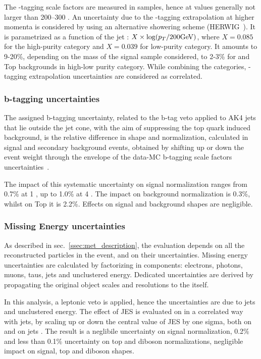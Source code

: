 \noindent The \V-tagging scale factors are measured in \ttbar samples, hence at \pt values generally not larger than 200--300 \GeV. An uncertainty due to the \V-tagging extrapolation at higher momenta is considered by using an alternative showering scheme (HERWIG~\cite{bib:HERWIG}). It is parametrized as a function of the jet \pt: $X \times \log(p_T/200 \text{GeV})$, where $X=0.085$ for the high-purity category and $X=0.039$ for low-purity category. It amounts to 9-20\%, depending on the mass of the signal sample considered, to 2-3\% for \VV and Top backgrounds in high-low purity category. While combining the categories, \V-tagging extrapolation uncertainties are considered as correlated.


\subsubsection{b-tagging uncertainties}
\label{sec:btagunc}
The assigned b-tagging uncertainty, related to the b-tag veto applied to AK4 jets that lie outside the \V jet cone, with the aim of suppressing the top quark induced background, is the relative difference in shape and normalization, calculated in signal and secondary background events, obtained by shifting up or down the event weight through the envelope of the data-MC b-tagging scale factors uncertainties~\cite{bib:btagsf}.

\noindent The impact of this systematic uncertainty on signal normalization ranges from 0.7\% at 1 \TeV, up to 1.0\% at 4 \TeV. The impact on \VV background normalization is 0.3\%, whilst on Top it is 2.2\%. Effects on signal and background shapes are negligible.

\subsubsection{Missing Energy uncertainties}
\label{metuncsec}
As described in sec.~\ref{ssec:met_description}, the \MET evaluation depends on all the reconstructed particles in the event, and on their uncertainties. Missing energy uncertainties are calculated by factorizing \met in components: electrons, photons, muons, taus, jets and unclustered energy. Dedicated uncertainties are derived by propagating the original object scales and resolutions to the \MET itself.

\noindent In this analysis, a leptonic veto is applied, hence the \MET uncertainties are due to jets and unclustered energy. The effect of JES is evaluated on \MET in a correlated way with jets, by scaling up or down the central value of JES by one sigma, both on \MET and on jets \pt. The result is a neglibile uncertainty on signal normalization, 0.2\% and less than 0.1\% uncertainty on top and diboson normalizations, negligible impact on signal, top and diboson shapes.

